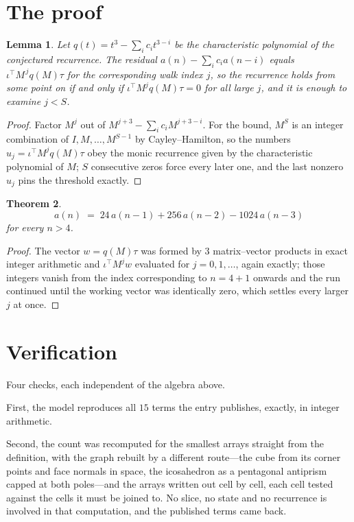 \documentclass[11pt,a4paper]{article}
\theoremstyle{plain}
\newtheorem{theorem}{Theorem}
\newtheorem{lemma}[theorem]{Lemma}
\theoremstyle{definition}
\begin{document}
\section{The proof}

\begin{lemma}\label{lem:crit}
Let $q(t)=t^{3}-\sum_i c_it^{3-i}$ be the characteristic polynomial of the
conjectured recurrence. The residual $a(n)-\sum_ic_ia(n-i)$ equals
$\iota^{\!\top}M^{\,j}q(M)\tau$ for the corresponding walk index $j$, so the recurrence
holds from some point on if and only if $\iota^{\!\top}M^{j}q(M)\tau=0$ for all large $j$,
and it is enough to examine $j<S$.
\end{lemma}

\begin{proof}
Factor $M^{j}$ out of $M^{j+3}-\sum_ic_iM^{j+3-i}$. For the bound, $M^{S}$
is an integer combination of $I,M,\dots,M^{S-1}$ by Cayley--Hamilton, so the numbers
$u_j=\iota^{\!\top}M^{j}q(M)\tau$ obey the monic recurrence given by the characteristic
polynomial of $M$; $S$ consecutive zeros force every later one, and the last nonzero $u_j$
pins the threshold exactly.
\end{proof}

\begin{theorem}
\[
a(n)\;=\;24\,a(n-1) + 256\,a(n-2) - 1024\,a(n-3)
\]
for every $n>4$.
\end{theorem}

\begin{proof}
The vector $w=q(M)\tau$ was formed by $3$ matrix--vector products in exact integer
arithmetic and $\iota^{\!\top}M^{j}w$ evaluated for $j=0,1,\dots$, again exactly; those
integers vanish from the index corresponding to $n=4+1$ onwards and the run continued
until the working vector was identically zero, which settles every larger $j$ at once.
\end{proof}

\section{Verification}

Four checks, each independent of the algebra above.

First, the model reproduces all $15$ terms the entry publishes, exactly, in integer
arithmetic.

Second, the count was recomputed for the smallest arrays straight from the definition, with the
graph rebuilt by a different route---the cube from its corner points and face normals in space,
the icosahedron as a pentagonal antiprism capped at both poles---and the arrays written out cell
by cell, each cell tested against the cells it must be joined to. No slice, no state and no
recurrence is involved in that computation, and the published terms came back.
\end{document}
